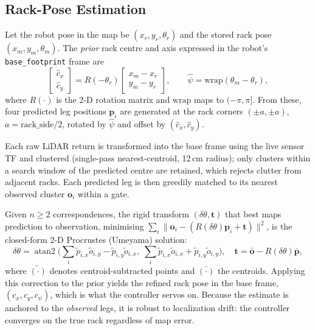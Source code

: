 \documentclass[11pt,a4paper]{article}
\newcommand{\code}[1]{\texttt{\small #1}}
\begin{document}
\subsection{Rack-Pose Estimation}\label{sec:estim}
Let the robot pose in the map be $(x_r,y_r,\theta_r)$ and the stored rack pose
$(x_m,y_m,\theta_m)$. The \emph{prior} rack centre and axis expressed in the
robot's \code{base\_footprint} frame are
\begin{equation}
\begin{bmatrix}\hat c_x\\ \hat c_y\end{bmatrix}=
R(-\theta_r)\begin{bmatrix}x_m-x_r\\ y_m-y_r\end{bmatrix},
\qquad \hat\psi=\mathrm{wrap}(\theta_m-\theta_r),
\end{equation}
where $R(\cdot)$ is the 2-D rotation matrix and $\mathrm{wrap}$ maps to
$(-\pi,\pi]$. From these, four predicted leg positions
$\mathbf p_i$ are generated at the rack corners $(\pm a,\pm a)$,
$a=\mathrm{rack\_side}/2$, rotated by $\hat\psi$ and offset by
$(\hat c_x,\hat c_y)$.

Each raw LiDAR return is transformed into the base frame using the live
sensor TF and clustered (single-pass nearest-centroid, 12\,cm radius); only
clusters within a search window of the predicted centre are retained, which
rejects clutter from adjacent racks. Each predicted leg is then greedily
matched to its nearest observed cluster $\mathbf o_i$ within a gate.

Given $n\!\ge\!2$ correspondences, the rigid transform $(\delta\theta,\mathbf t)$
that best maps prediction to observation, minimising
$\sum_i\lVert\mathbf o_i-(R(\delta\theta)\mathbf p_i+\mathbf t)\rVert^2$, is the
closed-form 2-D Procrustes (Umeyama) solution:
\begin{equation}
\delta\theta=\operatorname{atan2}\!\Big(\textstyle\sum_i \tilde p_{i,x}\tilde o_{i,y}-\tilde p_{i,y}\tilde o_{i,x},\;
\sum_i \tilde p_{i,x}\tilde o_{i,x}+\tilde p_{i,y}\tilde o_{i,y}\Big),
\quad \mathbf t=\bar{\mathbf o}-R(\delta\theta)\bar{\mathbf p},
\end{equation}
where $\tilde{(\cdot)}$ denotes centroid-subtracted points and
$\bar{(\cdot)}$ the centroids. Applying this correction to the prior yields
the refined rack pose in the base frame,
$(c_x,c_y,c_\psi)$, which is what the controller servos on. Because the
estimate is anchored to the \emph{observed} legs, it is robust to
localization drift: the controller converges on the true rack regardless of
map error.
\end{document}
